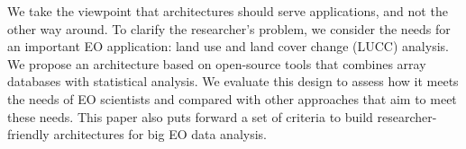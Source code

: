 \documentclass[a4paper, 11pt]{article}
\begin{document}
We take the viewpoint that architectures should serve applications, and not the other way around. To clarify the researcher's problem, we consider the needs for an important EO application: land use and land cover change (LUCC) analysis. We propose an architecture based on open-source tools that combines array databases with statistical analysis.  We evaluate this design to assess how it meets the needs of EO scientists and compared with other approaches that aim to meet these needs. This paper also puts forward a set of criteria to build researcher-friendly architectures for big EO data analysis.
\printbibliography
\end{document}
